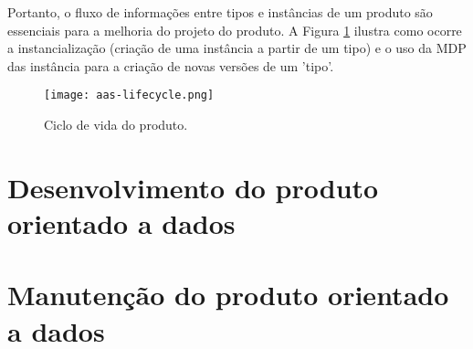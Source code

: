 	Portanto, o fluxo de informações entre tipos e instâncias de um produto são essenciais para a melhoria do projeto do produto. A Figura \ref{fig:aas-lifecycle} ilustra como ocorre a instancialização (criação de uma instância a partir de um tipo) e o uso da MDP das instância para a criação de novas versões de um 'tipo'.
	
	\begin{figure}[H]
	  \centering
	  \caption{Ciclo de vida do produto.}
	  \texttt{[image: aas-lifecycle.png]}
	  \label{fig:aas-lifecycle}
	\end{figure}


\section{Desenvolvimento do produto orientado a dados}

\lipsum[1-1]

\section{Manutenção do produto orientado a dados}

\lipsum[1-1]